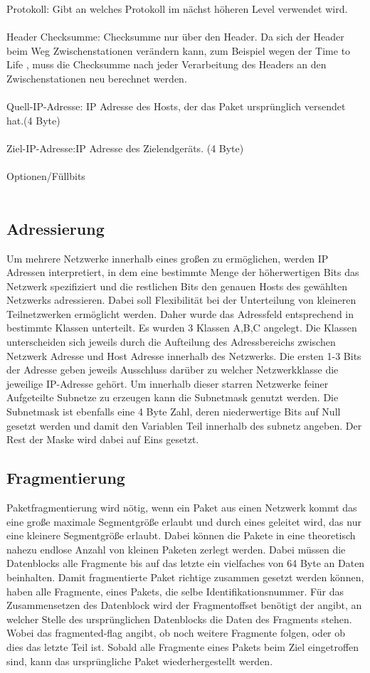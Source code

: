 Protokoll: Gibt an welches Protokoll im nächst höheren Level verwendet wird. \\\\
Header Checksumme: Checksumme nur über den Header. Da sich der Header beim Weg Zwischenstationen verändern kann, zum Beispiel wegen der Time to Life , muss die Checksumme nach jeder Verarbeitung des Headers an den Zwischenstationen neu berechnet werden.\\\\
Quell-IP-Adresse: IP Adresse des Hosts, der das Paket ursprünglich versendet hat.(4 Byte)\\\\
Ziel-IP-Adresse:IP Adresse des Zielendgeräts. (4 Byte)\\\\
Optionen/Füllbits\\\\
\subsection{Adressierung}
Um mehrere Netzwerke innerhalb eines großen zu ermöglichen, werden IP Adressen interpretiert, in dem eine bestimmte Menge der höherwertigen Bits das Netzwerk spezifiziert und die restlichen Bits den genauen Hosts des gewählten Netzwerks adressieren. Dabei soll Flexibilität bei der Unterteilung von kleineren Teilnetzwerken ermöglicht werden. Daher wurde das Adressfeld entsprechend in bestimmte Klassen unterteilt. Es wurden 3 Klassen A,B,C angelegt. Die Klassen unterscheiden sich jeweils durch die Aufteilung des Adressbereichs zwischen Netzwerk Adresse und Host Adresse innerhalb des Netzwerks. Die ersten 1-3 Bits der Adresse geben jeweils Ausschluss darüber zu welcher Netzwerkklasse die jeweilige IP-Adresse gehört. Um innerhalb dieser starren Netzwerke feiner Aufgeteilte Subnetze zu erzeugen kann die Subnetmask genutzt werden. Die Subnetmask ist ebenfalls eine 4 Byte Zahl, deren niederwertige Bits auf Null gesetzt werden und damit den Variablen Teil innerhalb des subnetz angeben. Der Rest der Maske wird dabei auf Eins gesetzt.


\subsection{Fragmentierung}

Paketfragmentierung wird nötig, wenn ein Paket aus einen Netzwerk kommt das eine große maximale Segmentgröße erlaubt und durch eines geleitet wird, das nur eine kleinere Segmentgröße erlaubt. Dabei können die Pakete in eine theoretisch nahezu endlose Anzahl von kleinen Paketen zerlegt werden. Dabei müssen die Datenblocks alle Fragmente bis auf das letzte ein vielfaches von 64 Byte an Daten beinhalten.
Damit fragmentierte Paket richtige zusammen gesetzt werden können, haben alle Fragmente, eines Pakets, die selbe Identifikationsnummer. Für das Zusammensetzen des Datenblock wird der Fragmentoffset benötigt der angibt, an welcher Stelle des ursprünglichen Datenblocks die Daten des Fragments stehen. Wobei das fragmented-flag angibt, ob noch weitere Fragmente folgen, oder ob dies das letzte Teil ist. Sobald alle Fragmente eines Pakets beim Ziel eingetroffen sind, kann das ursprüngliche Paket wiederhergestellt werden. 
\clearpage 

